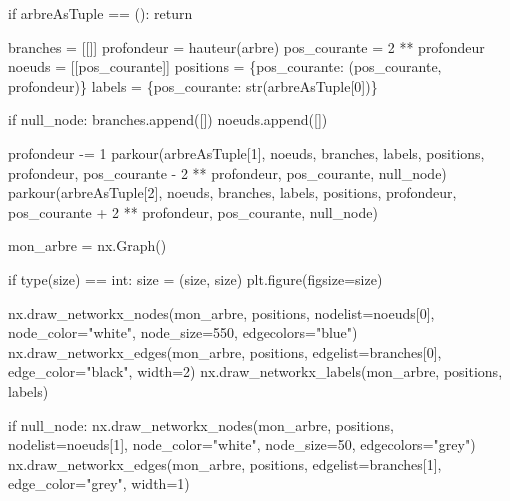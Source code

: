\documentclass[
  a4paper,
  DIV=11,
  numbers=noendperiod]{scrartcl}
\newenvironment{Shaded}{\begin{snugshade}}{\end{snugshade}}
\newcommand{\BuiltInTok}[1]{\textcolor[rgb]{0.00,0.23,0.31}{#1}}
\newcommand{\ControlFlowTok}[1]{\textcolor[rgb]{0.00,0.23,0.31}{#1}}
\newcommand{\DecValTok}[1]{\textcolor[rgb]{0.68,0.00,0.00}{#1}}
\newcommand{\NormalTok}[1]{\textcolor[rgb]{0.00,0.23,0.31}{#1}}
\newcommand{\OperatorTok}[1]{\textcolor[rgb]{0.37,0.37,0.37}{#1}}
\newcommand{\StringTok}[1]{\textcolor[rgb]{0.13,0.47,0.30}{#1}}
\begin{document}
\begin{tcolorbox}
\begin{Shaded}
\begin{Highlighting}[]
\ControlFlowTok{if}\NormalTok{ arbreAsTuple }\OperatorTok{==}\NormalTok{ ():}
    \ControlFlowTok{return}

\NormalTok{branches }\OperatorTok{=}\NormalTok{ [[]]}
\NormalTok{profondeur }\OperatorTok{=}\NormalTok{ hauteur(arbre)}
\NormalTok{pos\_courante }\OperatorTok{=} \DecValTok{2} \OperatorTok{**}\NormalTok{ profondeur}
\NormalTok{noeuds }\OperatorTok{=}\NormalTok{ [[pos\_courante]]}
\NormalTok{positions }\OperatorTok{=}\NormalTok{ \{pos\_courante: (pos\_courante, profondeur)\}}
\NormalTok{labels }\OperatorTok{=}\NormalTok{ \{pos\_courante: }\BuiltInTok{str}\NormalTok{(arbreAsTuple[}\DecValTok{0}\NormalTok{])\}}

\ControlFlowTok{if}\NormalTok{ null\_node:}
\NormalTok{    branches.append([])}
\NormalTok{    noeuds.append([])}

\NormalTok{profondeur }\OperatorTok{{-}=} \DecValTok{1}
\NormalTok{parkour(arbreAsTuple[}\DecValTok{1}\NormalTok{], noeuds, branches, labels, positions, profondeur, }
\NormalTok{        pos\_courante }\OperatorTok{{-}} \DecValTok{2} \OperatorTok{**}\NormalTok{ profondeur, pos\_courante, null\_node)}
\NormalTok{parkour(arbreAsTuple[}\DecValTok{2}\NormalTok{], noeuds, branches, labels, positions, profondeur, }
\NormalTok{        pos\_courante }\OperatorTok{+} \DecValTok{2} \OperatorTok{**}\NormalTok{ profondeur, pos\_courante, null\_node)}

\NormalTok{mon\_arbre }\OperatorTok{=}\NormalTok{ nx.Graph()}

\ControlFlowTok{if} \BuiltInTok{type}\NormalTok{(size) }\OperatorTok{==} \BuiltInTok{int}\NormalTok{:}
\NormalTok{    size }\OperatorTok{=}\NormalTok{ (size, size)}
\NormalTok{plt.figure(figsize}\OperatorTok{=}\NormalTok{size)}

\NormalTok{nx.draw\_networkx\_nodes(mon\_arbre, positions, nodelist}\OperatorTok{=}\NormalTok{noeuds[}\DecValTok{0}\NormalTok{], }
\NormalTok{                       node\_color}\OperatorTok{=}\StringTok{"white"}\NormalTok{, node\_size}\OperatorTok{=}\DecValTok{550}\NormalTok{, edgecolors}\OperatorTok{=}\StringTok{"blue"}\NormalTok{)}
\NormalTok{nx.draw\_networkx\_edges(mon\_arbre, positions, edgelist}\OperatorTok{=}\NormalTok{branches[}\DecValTok{0}\NormalTok{], }
\NormalTok{                       edge\_color}\OperatorTok{=}\StringTok{"black"}\NormalTok{, width}\OperatorTok{=}\DecValTok{2}\NormalTok{)}
\NormalTok{nx.draw\_networkx\_labels(mon\_arbre, positions, labels)}

\ControlFlowTok{if}\NormalTok{ null\_node:}
\NormalTok{    nx.draw\_networkx\_nodes(mon\_arbre, positions, nodelist}\OperatorTok{=}\NormalTok{noeuds[}\DecValTok{1}\NormalTok{], }
\NormalTok{                           node\_color}\OperatorTok{=}\StringTok{"white"}\NormalTok{, node\_size}\OperatorTok{=}\DecValTok{50}\NormalTok{, edgecolors}\OperatorTok{=}\StringTok{"grey"}\NormalTok{)}
\NormalTok{    nx.draw\_networkx\_edges(mon\_arbre, positions, edgelist}\OperatorTok{=}\NormalTok{branches[}\DecValTok{1}\NormalTok{], }
\NormalTok{                           edge\_color}\OperatorTok{=}\StringTok{"grey"}\NormalTok{, width}\OperatorTok{=}\DecValTok{1}\NormalTok{)}


\end{Highlighting}
\end{Shaded}
\end{tcolorbox}
\end{document}
